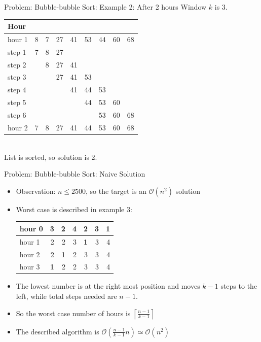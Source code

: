 \documentclass[11pt,pdf, aspectratio=169]{beamer}
\begin{document}
  \begin{frame}{Problem: Bubble-bubble Sort: Example 2: After 2 hours}
    Window $k$ is 3.\\
    \begin{tabular}{|l|rrrrrrrr|}
      \hline
      Hour   &   &   &    &    &    &    &    &    \\
      \hline
      hour 1 & 8 & 7 & 27 & 41 & 53 & 44 & 60 & 68 \\
      \hline
      step 1 & 7 & 8 & 27 &    &    &    &    &    \\
      step 2 &   & 8 & 27 & 41 &    &    &    &    \\
      step 3 &   &   & 27 & 41 & 53 &    &    &    \\
      step 4 &   &   &    & 41 & 44 & 53 &    &    \\
      step 5 &   &   &    &    & 44 & 53 & 60 &    \\
      step 6 &   &   &    &    &    & 53 & 60 & 68 \\
      \hline
      hour 2 & 7 & 8 & 27 & 41 & 44 & 53 & 60 & 68 \\
      \hline
    \end{tabular}\\
    List is sorted, so solution is 2.
  \end{frame}
  \begin{frame}{Problem: Bubble-bubble Sort: Naive Solution}
    \begin{itemize}
      \item<1-> Observation: $n \leq 2500$, so the target is an $\mathcal{O}(n^2)$  solution
      \item<2-> Worst case is described in example 3:\\
      \begin{tabular}{|l|rrrrrr|}
        \hline
        hour 0 & 3          & 2          & 4 & 2          & 3 & \textbf{1} \\
        \hline
        hour 1 & 2          & 2          & 3 & \textbf{1} & 3 & 4          \\
        hour 2 & 2          & \textbf{1} & 2 & 3          & 3 & 4          \\
        \hline
        hour 3 & \textbf{1} & 2          & 2 & 3          & 3 & 4          \\
        \hline
      \end{tabular}
      \item<3-> The lowest number is at the right most position and moves $k-1$ steps to the left, while total steps needed are $n-1$.
      \item<3-> So the worst case number of hours is $\left\lceil\frac{n-1}{k-1}\right\rceil$
      \item<4-> The described algorithm is $\mathcal{O}\left(\frac{n-1}{k-1}n\right) \simeq \mathcal{O}(n^2)$
    \end{itemize}
  \end{frame}
\end{document}

